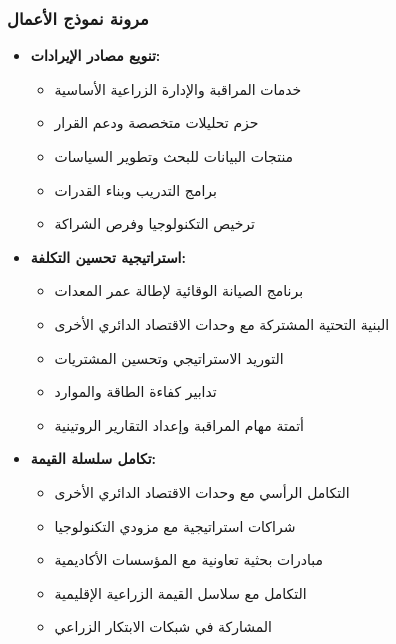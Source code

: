 \subsubsection{مرونة نموذج الأعمال}
\begin{itemize}
    \item \textbf{تنويع مصادر الإيرادات:}
    \begin{itemize}
        \item خدمات المراقبة والإدارة الزراعية الأساسية
        \item حزم تحليلات متخصصة ودعم القرار
        \item منتجات البيانات للبحث وتطوير السياسات
        \item برامج التدريب وبناء القدرات
        \item ترخيص التكنولوجيا وفرص الشراكة
    \end{itemize}
    
    \item \textbf{استراتيجية تحسين التكلفة:}
    \begin{itemize}
        \item برنامج الصيانة الوقائية لإطالة عمر المعدات
        \item البنية التحتية المشتركة مع وحدات الاقتصاد الدائري الأخرى
        \item التوريد الاستراتيجي وتحسين المشتريات
        \item تدابير كفاءة الطاقة والموارد
        \item أتمتة مهام المراقبة وإعداد التقارير الروتينية
    \end{itemize}
    
    \item \textbf{تكامل سلسلة القيمة:}
    \begin{itemize}
        \item التكامل الرأسي مع وحدات الاقتصاد الدائري الأخرى
        \item شراكات استراتيجية مع مزودي التكنولوجيا
        \item مبادرات بحثية تعاونية مع المؤسسات الأكاديمية
        \item التكامل مع سلاسل القيمة الزراعية الإقليمية
        \item المشاركة في شبكات الابتكار الزراعي
    \end{itemize}
\end{itemize}

